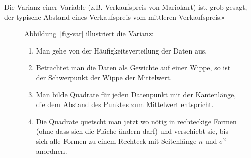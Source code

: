 \documentclass[
  letterpaper,
]{scrbook}
\providecommand{\tightlist}{%
  \setlength{\itemsep}{0pt}\setlength{\parskip}{0pt}}\usepackage{longtable,booktabs,array}
\theoremstyle{definition}
\theoremstyle{definition}
\theoremstyle{definition}
\theoremstyle{remark}
\begin{document}
\begin{tcolorbox}[enhanced jigsaw, left=2mm, toptitle=1mm, toprule=.15mm, rightrule=.15mm, leftrule=.75mm, breakable, colbacktitle=quarto-callout-note-color!10!white, colback=white, coltitle=black, bottomtitle=1mm, opacityback=0, title=\textcolor{quarto-callout-note-color}{\faInfo}\hspace{0.5em}{Hinweis}, colframe=quarto-callout-note-color-frame, arc=.35mm, opacitybacktitle=0.6, bottomrule=.15mm, titlerule=0mm]

Die Varianz einer Variable (z.B. Verkaufspreis von Mariokart) ist, grob
gesagt, der typische Abstand eines Verkaufspreis vom mittleren
Verkaufspreis.\(\square\)

\end{tcolorbox}

\begin{figure}

\begin{minipage}{0.60\linewidth}
Abbildung~\ref{fig-var} illustriert die Varianz:

\begin{enumerate}
\def\labelenumi{\arabic{enumi}.}
\tightlist
\item
  Man gehe von der Häufigkeitsverteilung der Daten aus.
\item
  Betrachtet man die Daten als Gewichte auf einer Wippe, so ist der
  Schwerpunkt der Wippe der Mittelwert.
\item
  Man bilde Quadrate für jeden Datenpunkt mit der Kantenlänge, die dem
  Abstand des Punktes zum Mittelwert entspricht.
\item
  Die Quadrate quetscht man jetzt wo nötig in rechteckige Formen (ohne
  dass sich die Fläche ändern darf) und verschiebt sie, bis sich alle
  Formen zu einem Rechteck mit Seitenlänge \(n\) und \(\sigma^2\)
  anordnen.
\end{enumerate}

\end{minipage}%
%
\begin{minipage}{0.40\linewidth}

\begin{figure}[H]

\centering{

}
\end{figure}
\end{minipage}
\end{figure}
\end{document}
